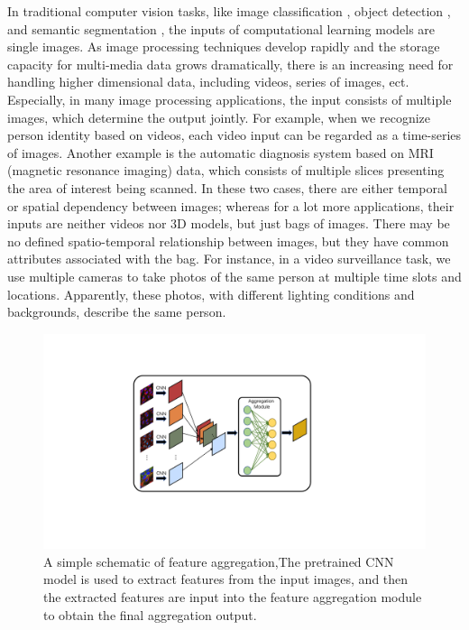 \documentclass[10pt,twocolumn,letterpaper]{article}
\begin{document}
In traditional computer vision tasks, like image classification \cite{ref1, ref2, ref3}, object detection \cite{ref4, ref5}, and semantic segmentation \cite{ref6, ref7}, the inputs of computational learning models are single images. As image processing techniques develop rapidly and the storage capacity for multi-media data grows dramatically, there is an increasing need for handling higher dimensional data, including videos, series of images, ect. Especially, in many image processing applications, the input consists of multiple images, which determine the output jointly. For example, when we recognize person identity based on videos, each video input can be regarded as a time-series of images. Another example is the automatic diagnosis system based on MRI (magnetic resonance imaging) data, which consists of multiple slices presenting the area of interest being scanned. In these two cases, there are either temporal or spatial dependency between images; whereas for a lot more applications, their inputs are neither videos nor 3D models, but just bags of images. There may be no defined spatio-temporal relationship between images, but they have common attributes associated with the bag. For instance, in a video surveillance task, we use multiple cameras to take photos of the same person at multiple time slots and locations. Apparently, these photos, with different lighting conditions and backgrounds, describe the same person. 

\begin{figure}[t]
\begin{center}
  \includegraphics[width=0.8\linewidth]{introduction.pdf}
\end{center}
   \caption{A simple schematic of feature aggregation,The pretrained CNN model is used to extract features from the input images, and then the extracted features are input into the feature aggregation module to obtain the final aggregation output. }
\label{fig:long}
\label{fig:onecol}
\end{figure}
\end{document}
